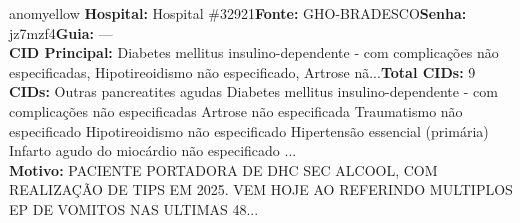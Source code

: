 \documentclass[a4paper,10pt]{article}
\begin{document}
\begin{anomalycard}[Interna\c{c}\~{a}o \#118763 | Pac. \#52574 | MODERADO (z=2.15) | LOS: 6d | 26/02/2026\,$\to$\,04/03/2026]{anomyellow}
\textbf{Hospital:} Hospital \#32921\quad \textbf{Fonte:} GHO-BRADESCO\quad \textbf{Senha:} jz7mzf4\quad \textbf{Guia:} ---\\

\textbf{CID Principal:} {\small Diabetes mellitus insulino-dependente - com complicações não especificadas, Hipotireoidismo não especificado, Artrose nã...}\quad\textbf{Total CIDs:} 9\\

\textbf{CIDs:} {\scriptsize Outras pancreatites agudas \textbar{} Diabetes mellitus insulino-dependente - com complicações não especificadas \textbar{} Artrose não especificada \textbar{} Traumatismo não especificado \textbar{} Hipotireoidismo não especificado \textbar{} Hipertensão essencial (primária) \textbar{} Infarto agudo do miocárdio não especificado \textbar{} ...}\\

\textbf{Motivo:} {\scriptsize PACIENTE PORTADORA DE DHC SEC ALCOOL, COM REALIZAÇÃO DE TIPS EM 2025. VEM HOJE AO REFERINDO MULTIPLOS EP DE VOMITOS NAS ULTIMAS 48...}\\




\end{anomalycard}
\end{document}

